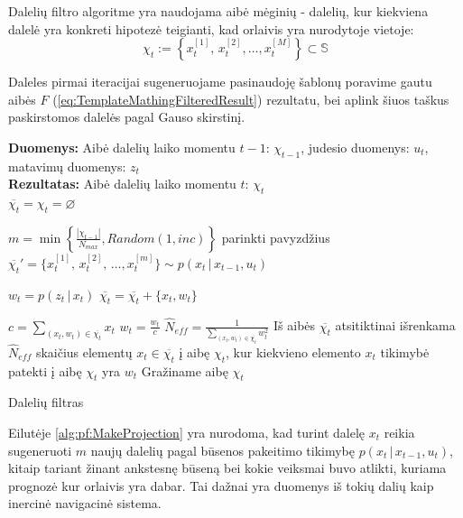 \documentclass[a4paper,12pt]{article}
\renewcommand{\KwData}{\textbf{Duomenys:}}
\renewcommand{\KwResult}{\textbf{Rezultatas:}}
\begin{document}
		Dalelių filtro algoritme yra naudojama aibė mėginių - dalelių, kur kiekviena dalelė yra konkreti hipotezė teigianti, kad orlaivis yra nurodytoje vietoje:
		\begin{equation}
		\chi_{t} := \left\{x_{t}^{[1]},\, x_{t}^{[2]}, \dots ,x_{t}^{[M]} \right\} \subset \mathbb{S}
		\end{equation}
		
		Daleles pirmai iteracijai sugeneruojame pasinaudoję šablonų poravime gautu aibės $F$ (\ref{eq:TemplateMathingFilteredResult}) rezultatu, bei aplink šiuos taškus paskirstomos dalelės pagal Gauso skirstinį.
		
		\begin{algorithm}[h]
			\label{alg:pf}
			\SetNlSty{}{}{:}
			\LinesNumbered
			
			\KwData{ Aibė dalelių laiko momentu $t-1$: $\chi_{t-1}$, judesio duomenys: $u_t$, matavimų duomenys: $z_t$\\}
			\KwResult{ Aibė dalelių laiko momentu $t$: $\chi_{t}$ \\}		
			$\overline{\chi_{t}} = \chi_{t} = \varnothing$\;
			{		
				$m = \min\left\{\frac{|\chi_{t-1}|}{N_{max}}, Random(1,inc)\right\}$ \label{alg:pf:HowManyProjectionstoMake} \;
				parinkti pavyzdžius $\overline{\chi_{t}}' = \{ x_t^{[1]},\, x_t^{[2]},\, \dots, x_t^{[m]}\} \sim p(x_t \,|\, x_{t-1}, u_t)$  \label{alg:pf:MakeProjection}\;
				
				{
					$w_t = p(z_t \,|\, x_t)$ \label{alg:pf:WeightProjection}\;
					$\overline{\chi_{t}} = \overline{\chi_{t}} + \{x_t,w_t\}$
				}			
			}
			$c = \sum_{(x_t,w_t) \in \overline{\chi_{t}}}x_t$ \;
			{
				$w_t = \frac{w_t}{c}$ \label{alg:pf:Normalization}\;
			}		
			$\hat{N}_{eff} =  \frac{1}{\sum_{(x_t,w_t) \in \overline{\chi_{t}}}{w_t^2}}$ \label{alg:pf:EfficientSampleNumber}\;
			Iš aibės $\overline{\chi_{t}}$ atsitiktinai išrenkama $\hat{N}_{eff}$ skaičius elementų $x_t \in \overline{\chi_{t}}$ į aibę $\chi_{t}$, kur kiekvieno elemento $x_t$ tikimybė patekti į aibę $\chi_{t}$ yra $w_t$ \label{alg:pf:Resample}\;
			Gražiname aibę $\chi_{t}$\;
			\caption{Dalelių filtras}
		\end{algorithm}
						
		Eilutėje \ref{alg:pf:MakeProjection} yra nurodoma, kad turint dalelę $x_t$ reikia sugeneruoti $m$ naujų dalelių pagal būsenos pakeitimo tikimybę $p(x_t \,|\, x_{t-1}, u_t)$, kitaip tariant žinant ankstesnę būseną bei kokie veiksmai buvo atlikti, kuriama prognozė kur orlaivis yra dabar. Tai dažnai yra duomenys iš tokių dalių kaip inercinė navigacinė sistema.
		
\end{document}
